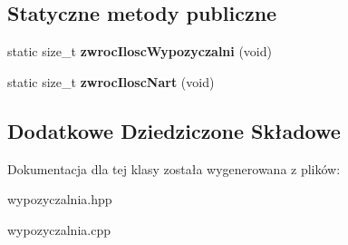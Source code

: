 \subsection*{Statyczne metody publiczne}
\begin{DoxyCompactItemize}
\item 
\mbox{\label{class_wypozyczalnia_a98cc31471aaf1bedc8c194b8aed569fa}} 
static size\+\_\+t {\bfseries zwroc\+Ilosc\+Wypozyczalni} (void)
\item 
\mbox{\label{class_wypozyczalnia_a032fa06c91b8387bd88a8c8327fa285b}} 
static size\+\_\+t {\bfseries zwroc\+Ilosc\+Nart} (void)
\end{DoxyCompactItemize}
\subsection*{Dodatkowe Dziedziczone Składowe}


Dokumentacja dla tej klasy została wygenerowana z plików\+:\begin{DoxyCompactItemize}
\item 
wypozyczalnia.\+hpp\item 
wypozyczalnia.\+cpp\end{DoxyCompactItemize}
